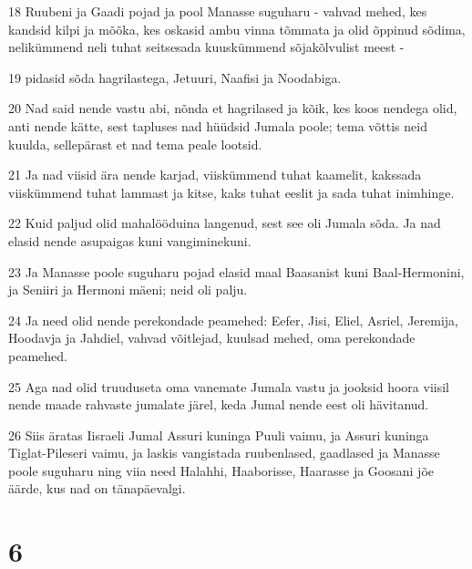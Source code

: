 \par 18 Ruubeni ja Gaadi pojad ja pool Manasse suguharu - vahvad mehed, kes kandsid kilpi ja mõõka, kes oskasid ambu vinna tõmmata ja olid õppinud sõdima, nelikümmend neli tuhat seitsesada kuuskümmend sõjakõlvulist meest -
\par 19 pidasid sõda hagrilastega, Jetuuri, Naafisi ja Noodabiga.
\par 20 Nad said nende vastu abi, nõnda et hagrilased ja kõik, kes koos nendega olid, anti nende kätte, sest tapluses nad hüüdsid Jumala poole; tema võttis neid kuulda, sellepärast et nad tema peale lootsid.
\par 21 Ja nad viisid ära nende karjad, viiskümmend tuhat kaamelit, kakssada viiskümmend tuhat lammast ja kitse, kaks tuhat eeslit ja sada tuhat inimhinge.
\par 22 Kuid paljud olid mahalööduina langenud, sest see oli Jumala sõda. Ja nad elasid nende asupaigas kuni vangiminekuni.
\par 23 Ja Manasse poole suguharu pojad elasid maal Baasanist kuni Baal-Hermonini, ja Seniiri ja Hermoni mäeni; neid oli palju.
\par 24 Ja need olid nende perekondade peamehed: Eefer, Jisi, Eliel, Asriel, Jeremija, Hoodavja ja Jahdiel, vahvad võitlejad, kuulsad mehed, oma perekondade peamehed.
\par 25 Aga nad olid truuduseta oma vanemate Jumala vastu ja jooksid hoora viisil nende maade rahvaste jumalate järel, keda Jumal nende eest oli hävitanud.
\par 26 Siis äratas Iisraeli Jumal Assuri kuninga Puuli vaimu, ja Assuri kuninga Tiglat-Pileseri vaimu, ja laskis vangistada ruubenlased, gaadlased ja Manasse poole suguharu ning viia need Halahhi, Haaborisse, Haarasse ja Goosani jõe äärde, kus nad on tänapäevalgi.

\chapter{6}

